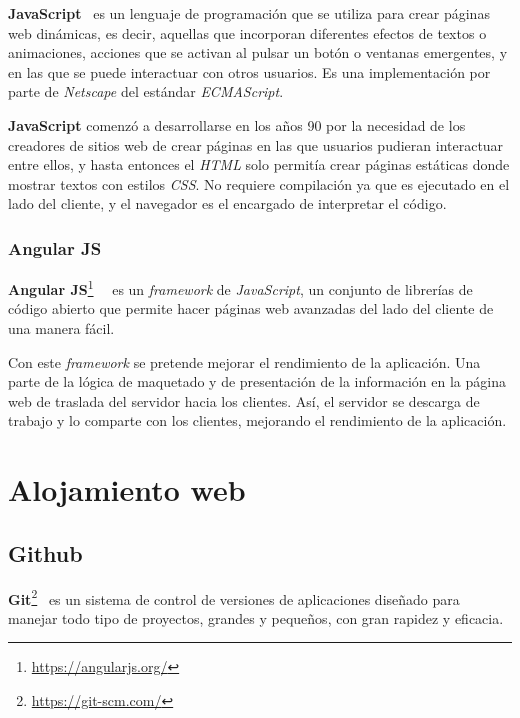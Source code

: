 \documentclass[a4paper, 12pt]{book}
\begin{document}
\textbf{JavaScript}~\cite{pagina-javascript} es un lenguaje de programación que se utiliza para crear páginas web dinámicas, es decir, aquellas que incorporan diferentes efectos de textos o animaciones, acciones que se activan al pulsar un botón o ventanas emergentes, y en las que se puede interactuar con otros usuarios.  Es una implementación por parte de \textit{Netscape} del estándar \textit{ECMAScript}.
\newline

\textbf{JavaScript} comenzó a desarrollarse en los años 90 por la necesidad de los creadores de sitios web de crear páginas en las que usuarios pudieran interactuar entre ellos, y hasta entonces el \textit{HTML} solo permitía crear páginas estáticas donde mostrar textos con estilos \textit{CSS}. No requiere compilación ya que es ejecutado en el lado del cliente, y el navegador es el encargado de interpretar el código. 

\subsubsection{Angular JS} 
\label{subsubsec:angular-js}

\textbf{Angular JS}\footnote{\url{https://angularjs.org/}}~\cite{pagina-angularjs}~\cite{Lerner:_ng-book} es un \textit{framework} de \textit{JavaScript}, un conjunto de librerías de código abierto que permite hacer páginas web avanzadas del lado del cliente de una manera fácil.
\newline

Con este \textit{framework} se pretende mejorar el rendimiento de la aplicación. Una parte de la lógica de maquetado y de presentación de la información en la página web de traslada del servidor hacia los clientes. Así, el servidor se descarga de trabajo y lo comparte con los clientes, mejorando el rendimiento de la aplicación.


\section{Alojamiento web} 
\label{sec:alojamiento-web}


\subsection{Github} 
\label{subsec:github}

\textbf{Git}\footnote{\url{https://git-scm.com/}}~\cite{pagina-git} es un sistema de control de versiones de aplicaciones diseñado para manejar todo tipo de proyectos, grandes y pequeños, con gran rapidez y eficacia.
\newline
\end{document}
